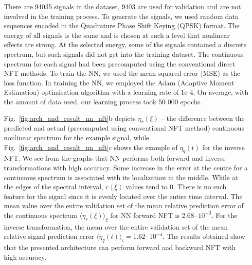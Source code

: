 There are 94035 signals in the dataset, 9403 are used for validation and are not involved in the training process. To generate the signals, we used random data sequences encoded in the Quadrature Phase Shift Keying (QPSK) format. The energy of all signals is the same and is chosen at such a level that nonlinear effects are strong. At the selected energy, some of the signals contained a discrete spectrum, but such signals did not get into the training dataset. The continuous spectrum for each signal had been precomputed using the conventional direct NFT methods. To train the NN, we used the mean squared error (MSE) as the loss function. In training the NN, we employed the Adam (Adaptive Moment Estimation) optimisation algorithm with a learning rate of 1e-4. On average, with the amount of data used, our learning process took 50 000 epochs.

Fig.~\ref{fig:arch_and_result_nn_nft}b depicts $\eta_r(\xi)$ -- the difference between the predicted and actual (precomputed using conventional NFT method) continuous nonlinear spectrum for the example signal, while Fig.~\ref{fig:arch_and_result_nn_nft}c shows the example of $\eta_q(t)$ for the inverse NFT. We see from the graphs that NN performs both forward and inverse transformations with high accuracy. Some increase in the error at the centre for a continuous spectrum is associated with its localization in the middle. While at the edges of the spectral interval, $r(\xi)$ values tend to $0$. There is no such feature for the signal since it is evenly located over the entire time interval.
The mean value over the entire validation set of the mean relative prediction error of the continuous spectrum $\langle \eta_r(\xi) \rangle_{\xi}$ for NN forward NFT is $2.68 \cdot 10^{-3}$. For the inverse transformation, the mean over the entire validation set of the mean relative signal prediction error $\langle \eta_q(t) \rangle_{t} = 1.62 \cdot 10^{-4}$.
The results obtained show that the presented architecture can perform forward and backward NFT with high accuracy.




